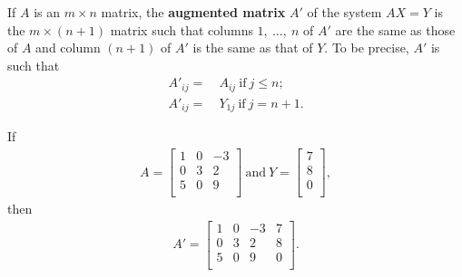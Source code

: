 \documentclass[12pt]{article}
\begin{document}
\begin{defn}
  If $A$ is an $m \times n$ matrix, the \textbf{augmented matrix}
  $A'$ of the system $AX = Y$ is the $m \times (n + 1)$ matrix
  such that columns $1,\ \ldots,\ n$ of $A'$ are the same as
  those of $A$ and column $(n + 1)$ of $A'$ is the same as that
  of $Y$. To be precise, $A'$ is such that
  \begin{align*}
    A'_{ij} =&\ A_{ij}\ \text{if}\ j \leq n;\\
    A'_{ij} =&\ Y_{1j}\ \text{if}\ j = n + 1.
  \end{align*}

  \begin{exm}
    If
    \begin{align*}
      A =
      \begin{bmatrix}
        1 & 0 & -3\\
        0 & 3 &  2\\
        5 & 0 &  9\\
      \end{bmatrix}\ \text{and}\ 
      Y =
      \begin{bmatrix}
        7\\
        8\\
        0\\
      \end{bmatrix},
    \end{align*}
    then
    \begin{align*}
      A' =
      \begin{bmatrix}
        1 & 0 & -3 & 7\\
        0 & 3 &  2 & 8\\
        5 & 0 &  9 & 0\\
      \end{bmatrix}.
    \end{align*}
  \end{exm}
\end{defn}
\end{document}
